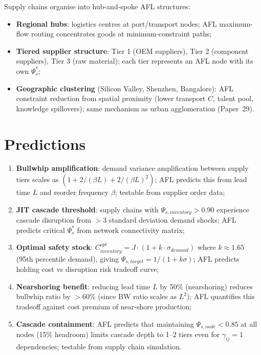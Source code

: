 \documentclass[11pt]{article}
\begin{document}
Supply chains organise into hub-and-spoke AFL structures:
\begin{itemize}
    \item \textbf{Regional hubs}: logistics centres at port/transport nodes; AFL maximum-flow
          routing concentrates goods at minimum-constraint paths;
    \item \textbf{Tiered supplier structure}: Tier 1 (OEM suppliers), Tier 2 (component suppliers),
          Tier 3 (raw material); each tier represents an AFL node with its own $\Psi_s^*$;
    \item \textbf{Geographic clustering} (Silicon Valley, Shenzhen, Bangalore): AFL constraint
          reduction from spatial proximity (lower transport $C$, talent pool, knowledge spillovers);
          same mechanism as urban agglomeration (Paper~29).
\end{itemize}

\section{Predictions}

\begin{enumerate}
    \item \textbf{Bullwhip amplification}: demand variance amplification between supply tiers
          scales as $(1 + 2/(\beta L) + 2/(\beta L)^2)$; AFL predicts this from lead time $L$
          and reorder frequency $\beta$; testable from supplier order data;
    \item \textbf{JIT cascade threshold}: supply chains with $\Psi_{s,inventory} > 0.90$ experience
          cascade disruption from $>$3 standard deviation demand shocks; AFL predicts critical
          $\Psi_s^*$ from network connectivity matrix;
    \item \textbf{Optimal safety stock}: $C_{inventory}^{opt} = J \cdot (1 + k \cdot \sigma_{demand})$
          where $k \approx 1.65$ (95th percentile demand), giving $\Psi_{s,target} = 1/(1 + k\sigma)$;
          AFL predicts holding cost vs disruption risk tradeoff curve;
    \item \textbf{Nearshoring benefit}: reducing lead time $L$ by 50\% (nearshoring) reduces
          bullwhip ratio by $>$60\% (since BW ratio scales as $L^2$); AFL quantifies this
          tradeoff against cost premium of near-shore production;
    \item \textbf{Cascade containment}: AFL predicts that maintaining $\Psi_{s,node} < 0.85$ at
          all nodes (15\% headroom) limits cascade depth to 1--2 tiers even for $\gamma_{ij} = 1$
          dependencies; testable from supply chain simulation.
\end{enumerate}
\end{document}
